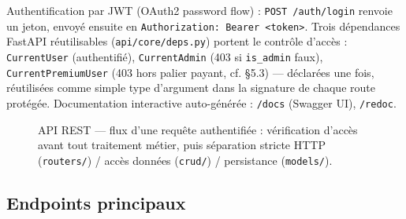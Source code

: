 \documentclass{article}
\begin{document}
Authentification par JWT (OAuth2 password flow) : \texttt{POST /auth/login} renvoie un jeton, envoyé ensuite en \texttt{Authorization: Bearer <token>}. Trois dépendances FastAPI réutilisables (\texttt{api/core/deps.py}) portent le contrôle d'accès : \texttt{CurrentUser} (authentifié), \texttt{CurrentAdmin} (403 si \texttt{is\_admin} faux), \texttt{CurrentPremiumUser} (403 hors palier payant, cf. \S5.3) — déclarées une fois, réutilisées comme simple type d'argument dans la signature de chaque route protégée. Documentation interactive auto-générée : \texttt{/docs} (Swagger UI), \texttt{/redoc}.

\begin{figure}[H]
\centering
{}
\caption{API REST — flux d'une requête authentifiée : vérification d'accès avant tout traitement métier, puis séparation stricte HTTP (\texttt{routers/}) / accès données (\texttt{crud/}) / persistance (\texttt{models/}).}
\label{fig:api-archi}
\end{figure}

\subsection{Endpoints principaux}
\end{document}
